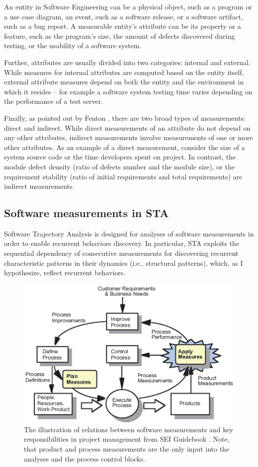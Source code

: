 An entity in Software Engineering can be a physical object, such as a program or a use case diagram, 
an event, such as a software release, or a software artifact, such as a bug report.
A measurable entity's attribute can be its property or a feature, such as the program's size, the 
amount of defects discovered during testing, or the usability of a software system.

Further, attributes are usually divided into two categories: internal and external. 
While measures for internal attributes are computed based on the entity itself, external attribute 
measures depend on both the entity and the environment in which it resides -- for example a 
software system testing time varies depending on the performance of a test server.

Finally, as pointed out by Fenton \cite{citeulike:1803429}, there are two broad types of measurements: direct
and indirect. While direct measurements of an attribute do not depend on any other attributes, 
indirect measurements involve measurements of one or more other attributes. 
As an example of a direct measurement, consider the size of a system source code or the time developers spent 
on project. In contrast, the module defect density (ratio of defects number and the module size), 
or the requirement stability (ratio of initial requirements and total requirements) are indirect measurements.

\subsection{Software measurements in STA}
Software Trajectory Analysis is designed for analyses of software measurements in order to enable 
recurrent behaviors discovery. In particular, STA exploits the sequential dependency of consecutive 
measurements for discovering recurrent characteristic patterns in their dynamics (i.e., structural patterns), 
which, as I hypothesize, reflect recurrent behaviors.

\begin{figure}[t]
   \centering
   \includegraphics[width=115mm]{figures/SEI-measurements.eps}
   \caption{The illustration of relations between software measurements and key responsibilities 
   in project management from SEI Guidebook \cite{citeulike:10567306}. Note, that product and process 
   measurements are the only input into the analyses and the process control blocks.}
   \label{fig:sei-measures}
\end{figure}

